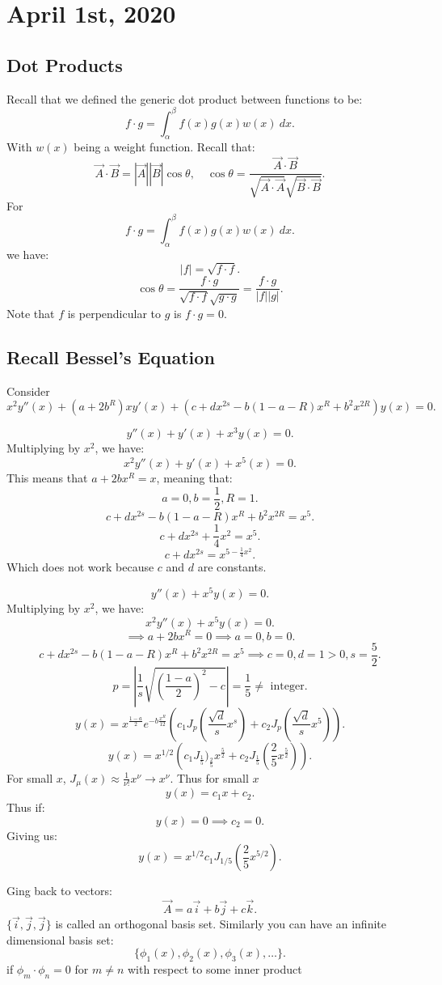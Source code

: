 \documentclass[../main/main.tex]{subfiles}
\begin{document}
\section{April  1st, 2020}
\subsection{Dot Products}
Recall that we defined the generic dot product between functions to be: \[
	f\cdot g = \int^\beta_\alpha f(x)g(x) w(x) ~dx
.\] With $w(x) $ being a weight function. Recall that: \[
\vec{A}\cdot \vec{B} = |\vec{A}||\vec{B}| \cos \theta ,\quad \cos\theta = \frac{\vec{A}\cdot \vec{B}}{\sqrt{\vec{A}\cdot \vec{A}} \sqrt{\vec{B}\cdot \vec{B}}  } 
.\] 
For \[
	f\cdot g = \int^\beta_\alpha f(x)g(x) w(x) ~dx 
.\] we have: \[
|f| = \sqrt{f\cdot f} 
.\] \[
\cos \theta = \frac{f\cdot g}{\sqrt{f\cdot f} \sqrt{g\cdot g} }= \frac{f\cdot g}{|f| |g|}
.\] 
Note that $f$ is perpendicular to $g$ is  $f\cdot g = 0$.
\subsection{Recall Bessel's Equation}
 Consider \[
	 x^2y''(x)+(a+2b^{R})xy'(x) + (c+dx^{2s}-b(1-a-R)x^{R}+b^2x^{2R})y(x) =0
.\] 
\begin{example}
	\[
		y''(x) + y'(x) + x^{3}y(x) = 0
	.\] Multiplying by $x^2$, we have: \[
	x^2y''(x) + y'(x) + x^{5}(x) =0
	.\] This means that $a+2bx^{R}=x$, meaning that: \[
	a=0, b=\frac{1}{2}, R=1
	.\] \[
	c+dx^{2s}-b(1-a-R)x^{R}+b^2x^{2R}=x^{5}
	.\] \[
	c+dx^{2s}+\frac{1}{4}x^2=x^{5}
	.\] \[
	c+dx^{2s}=x^{5-\frac{1}{4} x^{2}}
	.\] Which does not work because $c$ and $d$ are constants.
\end{example}
\begin{example}
	\[
		y''(x) + x^{5}y(x) = 0
	.\] Multiplying by $x^2$, we have: \[
	x^2y''(x) + x^{5}y(x) = 0
	.\] \[
	\implies a+2bx^{R}=0 \implies a=0, b=0
	.\] \[
	c+dx^{2s}-b(1-a-R)x^{R}+b^2x^{2R}=x^{5}\implies c=0, d=1>0, s = \frac{5}{2}
	.\] \[
	p = \left| \frac{1}{s} \sqrt{\left( \frac{1-a}{2} \right) ^2-c}  \right|  = \frac{1}{5}\neq  \text{ integer}
	.\] \[
	y(x) = x^{\frac{1-a}{2}} e^{-b\frac{x^{R}}{12}}\left( c_1J_p\left( \frac{\sqrt{d} }{s}x^{s} \right)+c_2 J_p\left( \frac{\sqrt{d} }{s}x^{5} \right)   \right) 
	.\] 
	\[
		y(x) = x^{1/2}\left( c_1 J_{\frac{1}{5}} )_\frac{2}{5}x^{\frac{5}{2}}+c_2 J_{\frac{1}{5}} \left( \frac{2}{5}x^{\frac{5}{2}} \right) \right) 
	.\] For small $x$, $J_\mu(x) \approx \frac{1}{\nu!}x^{\nu}\to  x^{\nu}$. Thus for small $x$ \[
	y(x) = c_1 x+c_2
.\] Thus if: \[
y(x) = 0 \implies c_2 = 0
.\] Giving us: \[
y(x) = x^{1/2} c_1J_{1/5}\left( \frac{2}{5}x^{5/2} \right) 
.\] 
\end{example}
Ging back to vectors: \[
	\vec{A} = a\vec{i} + b\vec{j} + c\vec{k}
.\] $\{\vec{i},\vec{j},\vec{j}\} $ is called an orthogonal basis set. Similarly you can have an infinite dimensional basis set: \[
\{ \phi_1(x),\phi_2(x),\phi_3(x),\ldots\}  
.\] if $\phi_m\cdot \phi_n=0$ for $m\neq n$ with respect to some inner product
\end{document}
